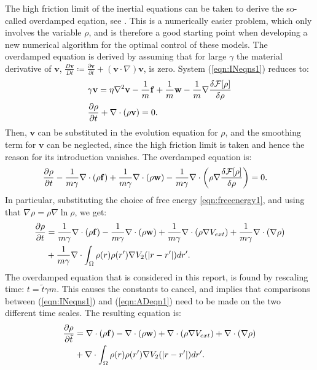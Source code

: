 \documentclass[11pt, a4paper]{article}
\theoremstyle{definition}
\newcommand{\Sta}{\rho}
\newcommand{\Stav}{\mathbf{v}}
\newcommand{\Con}{\mathbf{f}}
\begin{document}
The high friction limit of the inertial equations can be taken to derive the so-called overdamped eqation, see \cite{Archer1}. This is a numerically easier problem, which only involves the variable $\rho$, and is therefore a good starting point when developing a new numerical algorithm for the optimal control of these models. 
The overdamped equation is derived by assuming that for large $\gamma$ the material derivative of $\Stav$, $\frac{D \Stav}{D t} \coloneqq  \frac{\partial \Stav}{\partial t} + (\Stav \cdot \nabla)\Stav$, is zero.
System (\ref{eqn:INeqns1}) reduces to:
 \begin{align*}
&\gamma \Stav=\eta \nabla^2 \Stav  -\frac{1}{m}\Con +\frac{1}{m}\mathbf{w} - \frac{1}{m}\nabla \frac{\delta \mathcal{F}[\Sta]}{\delta \Sta}\\
 &\frac{\partial \Sta}{\partial t} + \nabla \cdot (\Sta \Stav)=0 \notag.
 \end{align*}
Then, $\Stav$ can be substituted in the evolution equation for $\rho$, and the smoothing term for $\Stav$ can be neglected, since the high friction limit is taken and hence the reason for its introduction vanishes. The overdamped equation is:
  \begin{align*}
 &\frac{\partial \Sta}{\partial t} -\frac{1}{m \gamma}\nabla \cdot (\Sta\Con) +\frac{1}{m \gamma} \nabla \cdot (\Sta \mathbf{w}) - \frac{1}{m \gamma}\nabla \cdot \bigg(\Sta\nabla \frac{\delta \mathcal{F}[\Sta]}{\delta \Sta}\bigg)=0 \notag.
 \end{align*}
 In particular, substituting the choice of free energy \eqref{eqn:freeenergy1}, and using that $\nabla \rho = \rho\nabla \ln \rho$, we get:
\begin{align*}
\frac{\partial \Sta}{\partial t} &= \frac{1}{m \gamma}\nabla \cdot (\Sta\Con) -\frac{1}{m \gamma} \nabla \cdot (\Sta \mathbf{w})  + \frac{1}{m \gamma}\nabla \cdot (\rho\nabla V_{ext}) + \frac{1}{m \gamma}\nabla \cdot (\nabla \rho) \\
&+\frac{1}{m \gamma}\nabla \cdot \int_\Omega \Sta(r)\Sta(r') \nabla V_2(|r-r'|)dr'\notag.
\end{align*}
The overdamped equation that is considered in this report, is found by rescaling time: $t = \tilde t \gamma m$. This causes the constants to cancel, and implies that comparisons between (\ref{eqn:INeqns1}) and (\ref{eqn:ADeqn1}) need to be made on the two different time scales.
The resulting equation is:
\begin{align}
\label{eqn:ADeqn1}
\frac{\partial \Sta}{\partial \tilde t} &= \nabla \cdot (\Sta\Con) - \nabla \cdot (\Sta \mathbf{w})  + \nabla \cdot (\rho\nabla V_{ext}) + \nabla \cdot (\nabla \rho) \\
&+\nabla \cdot \int_\Omega \Sta(r)\Sta(r') \nabla V_2(|r-r'|)dr'. \notag
\end{align}
\end{document}
